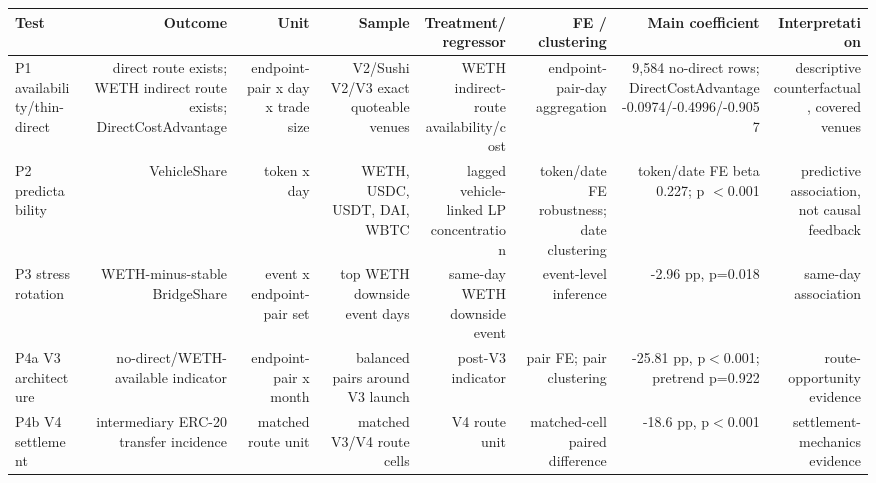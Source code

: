 \begin{tabular}{lrrrrrrr}
\toprule
Test & Outcome & Unit & Sample & Treatment/regressor & FE / clustering & Main coefficient & Interpretation \\
\midrule
P1 availability/thin-direct & direct route exists; WETH indirect route exists; DirectCostAdvantage & endpoint-pair x day x trade size & V2/Sushi V2/V3 exact quoteable venues & WETH indirect-route availability/cost & endpoint-pair-day aggregation & 9,584 no-direct rows; DirectCostAdvantage -0.0974/-0.4996/-0.9057 & descriptive counterfactual, covered venues \\
P2 predictability & VehicleShare & token x day & WETH, USDC, USDT, DAI, WBTC & lagged vehicle-linked LP concentration & token/date FE robustness; date clustering & token/date FE beta 0.227; p \ensuremath{<}0.001 & predictive association, not causal feedback \\
P3 stress rotation & WETH-minus-stable BridgeShare & event x endpoint-pair set & top WETH downside event days & same-day WETH downside event & event-level inference & -2.96 pp, p=0.018 & same-day association \\
P4a V3 architecture & no-direct/WETH-available indicator & endpoint-pair x month & balanced pairs around V3 launch & post-V3 indicator & pair FE; pair clustering & -25.81 pp, p\ensuremath{<}0.001; pretrend p=0.922 & route-opportunity evidence \\
P4b V4 settlement & intermediary ERC-20 transfer incidence & matched route unit & matched V3/V4 route cells & V4 route unit & matched-cell paired difference & -18.6 pp, p\ensuremath{<}0.001 & settlement-mechanics evidence \\
\bottomrule
\end{tabular}
